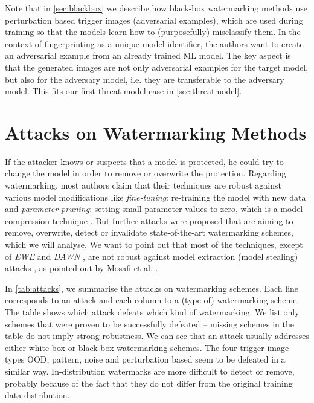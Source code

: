 Note that in \cref{sec:blackbox} we describe how black-box watermarking methods use perturbation based trigger images (adversarial examples), which are used during training so that the models learn how to (purposefully) misclassify them.
In the context of fingerprinting as a unique model identifier, the authors want to create an adversarial example from an already trained ML model. The key aspect is that the generated images are not only adversarial examples for the target model, but also for the adversary model, i.e. they are transferable to the adversary model. This %
fits our first threat model case in \cref{sec:threatmodel}.

\section{Attacks on Watermarking Methods}
\label{sec:attacks}

If the attacker knows or suspects that a model is protected, he could try to change the model in order to remove or overwrite the protection. 
Regarding watermarking, most authors claim that their techniques are robust against various model modifications like \textit{fine-tuning}: re-training the model with new data and \textit{parameter pruning}: setting small parameter values to zero, which is a model compression technique \cite{han_deep_2016,zhu_prune_2017}. %
But further attacks were proposed that are aiming to remove, overwrite, detect or invalidate state-of-the-art watermarking schemes, which we will analyse. %
We want to point out that most of the techniques, except of \textit{EWE} \cite{jia_entangled_2020} and \textit{DAWN} \cite{szyller_dawn_2020}, are not robust against model extraction (model stealing) attacks \cite{tramer_stealing_2016}, as pointed out by Mosafi et al. \cite{mosafi_stealing_2019}.

 
In \cref{tab:attacks}, we summarise the attacks on watermarking schemes.
Each line corresponds to an attack and each column to a (type of) watermarking scheme. The table shows which attack defeats which kind of watermarking. We list only schemes that were proven to be successfully defeated -- missing schemes in the table do not imply strong robustness. We can see that an attack usually addresses either white-box or black-box watermarking schemes. The four trigger image types OOD, pattern, noise and perturbation based seem to be defeated in a similar way. In-distribution watermarks are more difficult to detect or remove, probably because of the fact that they do not differ from the original training data distribution.
 
